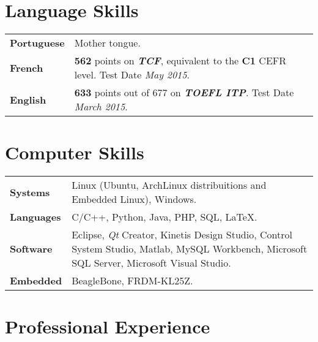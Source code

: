\documentclass[10pt, a4paper]{article}
\begin{document}



\section{Language Skills}

\begin{tabular}{p{} p{}}

\textbf{Portuguese} & Mother tongue.  \\ 

 
\textbf{French} & \textbf{562} points on \textbf{\textit{TCF}},
equivalent to the \textbf{C1} CEFR level. Test Date \textit{May 2015}.
\\


\textbf{English} & \textbf{633} points out of 677 on \textbf{\textit{TOEFL
ITP}}. Test Date \textit{March 2015}.
\\

\end{tabular}


\section{Computer Skills}

\begin{tabular}{p{} p{}}

 \textbf{Systems} & Linux (Ubuntu, ArchLinux distribuitions and Embedded Linux),
 Windows.
 \\

 \textbf{Languages} & C/C++, Python, Java, PHP, SQL, \LaTeX.
 \\
 
 \textbf{Software} & Eclipse, \textit{Qt} Creator, Kinetis Design Studio,
 Control System Studio, Matlab, MySQL Workbench, Microsoft SQL Server, Microsoft
 Visual Studio.\\
 
  \textbf{Embedded} & BeagleBone, FRDM-KL25Z. \\
\end{tabular}


\section{Professional Experience}
\end{document}
